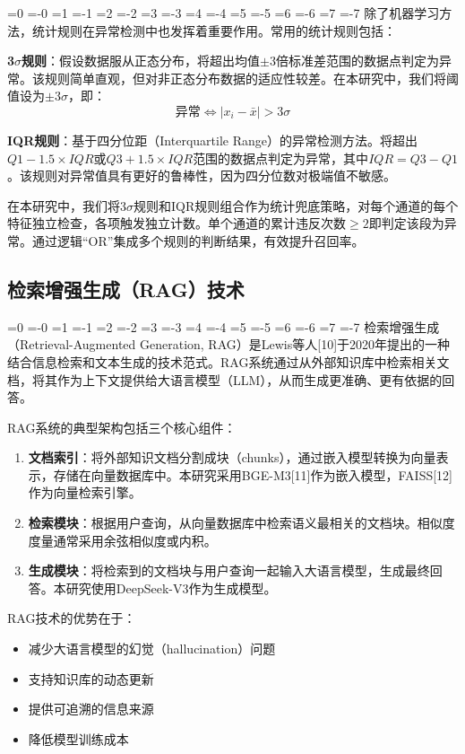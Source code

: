 \documentclass[12pt, a4paper]{article}
\newcommand{\zihao}[1]{%
    \ifnum#1=0 {\fontsize{42pt}{50pt}\selectfont}%
    \else\ifnum#1=-0 {\fontsize{36pt}{44pt}\selectfont}%
    \else\ifnum#1=1 {\fontsize{26pt}{32pt}\selectfont}%
    \else\ifnum#1=-1 {\fontsize{24pt}{28pt}\selectfont}%
    \else\ifnum#1=2 {\fontsize{22pt}{26pt}\selectfont}%
    \else\ifnum#1=-2 {\fontsize{18pt}{22pt}\selectfont}%
    \else\ifnum#1=3 {\fontsize{16pt}{20pt}\selectfont}%
    \else\ifnum#1=-3 {\fontsize{15pt}{18pt}\selectfont}%
    \else\ifnum#1=4 {\fontsize{14pt}{17pt}\selectfont}%
    \else\ifnum#1=-4 {\fontsize{12pt}{15pt}\selectfont}%
    \else\ifnum#1=5 {\fontsize{10.5pt}{13pt}\selectfont}%
    \else\ifnum#1=-5 {\fontsize{9pt}{11pt}\selectfont}%
    \else\ifnum#1=6 {\fontsize{7.5pt}{9pt}\selectfont}%
    \else\ifnum#1=-6 {\fontsize{6.5pt}{8pt}\selectfont}%
    \else\ifnum#1=7 {\fontsize{5.5pt}{7pt}\selectfont}%
    \else\ifnum#1=-7 {\fontsize{5pt}{6pt}\selectfont}%
    \fi\fi\fi\fi\fi\fi\fi\fi\fi\fi\fi\fi\fi\fi\fi\fi
}
\newcommand{\songti}{\CJKfontspec{SimSun}}
\begin{document}
\zihao{5}\songti
除了机器学习方法，统计规则在异常检测中也发挥着重要作用。常用的统计规则包括：

\textbf{3$\sigma$规则}：假设数据服从正态分布，将超出均值$\pm 3$倍标准差范围的数据点判定为异常。该规则简单直观，但对非正态分布数据的适应性较差。在本研究中，我们将阈值设为$\pm 3\sigma$，即：
\begin{equation}
\text{异常} \Leftrightarrow |x_i - \bar{x}| > 3\sigma
\end{equation}

\textbf{IQR规则}：基于四分位距（Interquartile Range）的异常检测方法。将超出$Q1 - 1.5 \times IQR$或$Q3 + 1.5 \times IQR$范围的数据点判定为异常，其中$IQR = Q3 - Q1$。该规则对异常值具有更好的鲁棒性，因为四分位数对极端值不敏感。

在本研究中，我们将3$\sigma$规则和IQR规则组合作为统计兜底策略，对每个通道的每个特征独立检查，各项触发独立计数。单个通道的累计违反次数$\geq 2$即判定该段为异常。通过逻辑``OR''集成多个规则的判断结果，有效提升召回率。

\subsection{检索增强生成（RAG）技术}

\zihao{5}\songti
检索增强生成（Retrieval-Augmented Generation, RAG）是Lewis等人[10]于2020年提出的一种结合信息检索和文本生成的技术范式。RAG系统通过从外部知识库中检索相关文档，将其作为上下文提供给大语言模型（LLM），从而生成更准确、更有依据的回答。

RAG系统的典型架构包括三个核心组件：

\begin{enumerate}[label=(\arabic*)]
    \item \textbf{文档索引}：将外部知识文档分割成块（chunks），通过嵌入模型转换为向量表示，存储在向量数据库中。本研究采用BGE-M3[11]作为嵌入模型，FAISS[12]作为向量检索引擎。
    \item \textbf{检索模块}：根据用户查询，从向量数据库中检索语义最相关的文档块。相似度度量通常采用余弦相似度或内积。
    \item \textbf{生成模块}：将检索到的文档块与用户查询一起输入大语言模型，生成最终回答。本研究使用DeepSeek-V3作为生成模型。
\end{enumerate}

RAG技术的优势在于：
\begin{itemize}
    \item 减少大语言模型的幻觉（hallucination）问题
    \item 支持知识库的动态更新
    \item 提供可追溯的信息来源
    \item 降低模型训练成本
\end{itemize}
\end{document}

